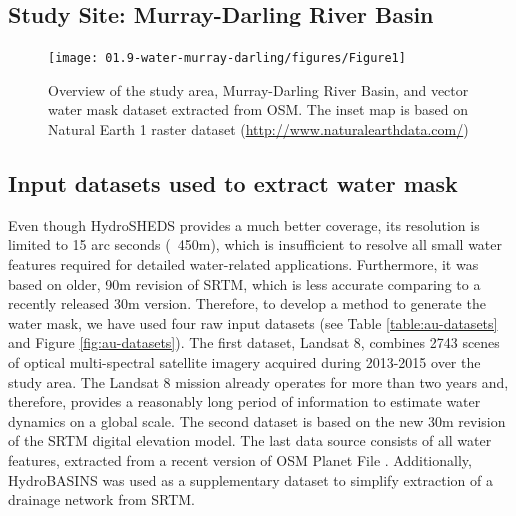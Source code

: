 \subsection{Study Site: Murray-Darling River Basin}
\begin{figure}[H]
	\centering
	\texttt{[image: 01.9-water-murray-darling/figures/Figure1]}
	\caption{Overview of the study area, Murray-Darling River Basin, and vector water mask dataset extracted from OSM. The inset map is based on Natural Earth 1 raster dataset (\url{http://www.naturalearthdata.com/})}
	\label{fig:au-study-area}
\end{figure}

\subsection{Input datasets used to extract water mask}
Even though HydroSHEDS provides a much better coverage, its resolution is limited to 15 arc seconds (~450m), which is insufficient to resolve all small water features required for detailed water-related applications. Furthermore, it was based on older, 90m revision of SRTM, which is less accurate comparing to a recently released 30m version. Therefore, to develop a method to generate the water mask, we have used four raw input datasets (see Table \ref{table:au-datasets} and Figure \ref{fig:au-datasets}). The first dataset, Landsat 8, combines 2743 scenes of optical multi-spectral satellite imagery acquired during 2013-2015 over the study area. The Landsat 8 mission already operates for more than two years and, therefore, provides a reasonably long period of information to estimate water dynamics on a global scale. The second dataset is based on the new 30m revision of the SRTM digital elevation model. The last data source consists of all water features, extracted from a recent version of OSM Planet File \citet{dataOSMPlanet}. Additionally, HydroBASINS \citet{Lehner2013} was used as a supplementary dataset to simplify extraction of a drainage network from SRTM.


